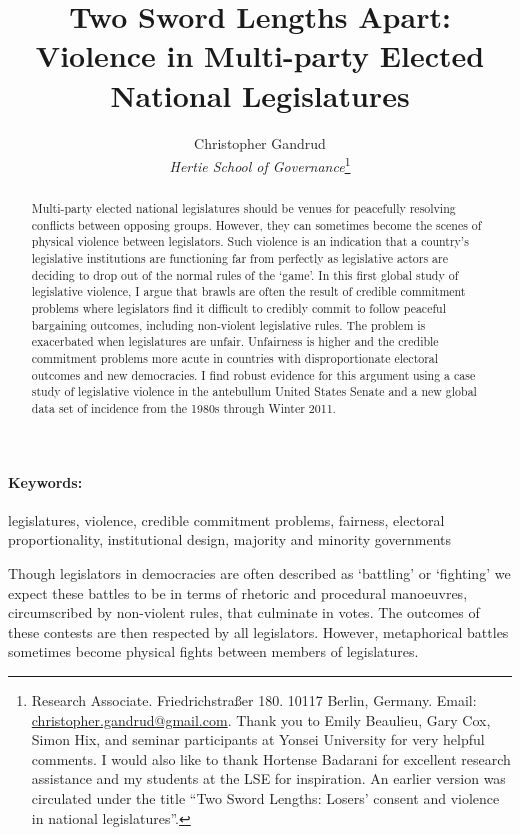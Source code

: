 \documentclass[a4paper]{article}\usepackage[]{graphicx}\usepackage[]{color}
\title{Two Sword Lengths Apart: Violence in Multi-party Elected National Legislatures}
\author{Christopher Gandrud \\
                {\emph{Hertie School of Governance}}\footnote{Research Associate. Friedrichstra{\ss}er 180. 10117 Berlin, Germany. Email: \href{mailto:christopher.gandrud@gmail.com}{christopher.gandrud@gmail.com}. Thank you to Emily Beaulieu, Gary Cox, Simon Hix, and seminar participants at Yonsei University for very helpful comments. I would also like to thank Hortense Badarani for excellent research assistance and my students at the LSE for inspiration. An earlier version was circulated under the title ``Two Sword Lengths: Losers' consent and violence in national legislatures''.}}
\begin{document}
\maketitle

\begin{abstract}
Multi-party elected national legislatures should be venues for peacefully resolving conflicts between opposing groups. However, they can sometimes become the scenes of physical violence between legislators. Such violence is an indication that a country's legislative institutions are functioning far from perfectly as legislative actors are deciding to drop out of the normal rules of the `game'. In this first global study of legislative violence, I argue that brawls are often the result of credible commitment problems where legislators find it difficult to credibly commit to follow peaceful bargaining outcomes, including non-violent legislative rules. The problem is exacerbated when legislatures are unfair. Unfairness is higher and the credible commitment problems more acute in countries with disproportionate electoral outcomes and new democracies. I find robust evidence for this argument using a case study of legislative violence in the antebullum United States Senate and a new global data set of incidence from the 1980s through Winter 2011.
\end{abstract}


\paragraph{Keywords:} legislatures, violence, credible commitment problems, fairness, electoral proportionality, institutional design, majority and minority governments

\vspace{0.3cm}


Though legislators in democracies are often described as `battling' or `fighting' we expect these battles to be in terms of rhetoric and procedural manoeuvres, circumscribed by non-violent rules, that culminate in votes. The outcomes of these contests are then respected by all legislators. However, metaphorical battles sometimes become physical fights between members of legislatures. 
\end{document}
